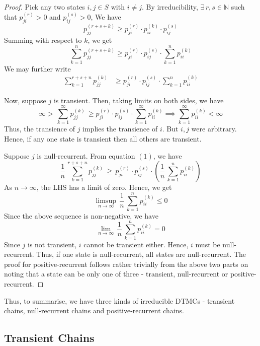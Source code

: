 \documentclass[12pt]{article}
\theoremstyle{definition}
\begin{document}
\setcounter{equation}{0}

\begin{proof}
    Pick any two states $i,j \in S$ with $i \neq j$. By irreducibility, $\exists \, r,s \in \mathbb{N}$ such that $p_{ji}^{(r)} > 0$ and $p_{ij}^{(s)} > 0$, We have
    \[
        p_{jj}^{(r+s+k)} \geq p_{ji}^{(r)} \cdot p_{ii}^{(k)} \cdot p_{ij}^{(s)}
    \]
    Summing with respect to $k$, we get
    \[
        \sum_{k=1}^{n} p_{jj}^{(r+s+k)} \geq p_{ji}^{(r)} \cdot p_{ij}^{(s)} \cdot \sum_{k=1}^n p_{ii}^{(k)}
    \]
    We may further write
    \begin{align}
        \sum_{k=1}^{r+s+n} p_{jj}^{(k)} &\geq p_{ji}^{(r)} \cdot p_{ij}^{(s)} \cdot \sum_{k=1}^n p_{ii}^{(k)}
    \end{align}
    
    Now, suppose $j$ is transient. Then, taking limits on both sides, we have
    \[
        \infty > \, \sum_{k=1}^{\infty} p_{jj}^{(k)} \, \geq p_{ji}^{(r)} \cdot p_{ij}^{(s)} \cdot \sum_{k=1}^{\infty} p_{ii}^{(k)} \implies \sum_{k=1}^{\infty} p_{ii}^{(k)} < \infty
    \]
    Thus, the transience of $j$ implies the transience of $i$. But $i,j$ were arbitrary. Hence, if any one state is transient then all others are transient. 
    
    \medskip
    
    Suppose $j$ is null-recurrent. From equation $(1)$, we have
    \[
        \frac{1}{n} \, \sum_{k=1}^{r+s+n} p_{jj}^{(k)} \, \geq \, p_{ji}^{(r)} \cdot p_{ij}^{(s)} \cdot \left( \frac{1}{n} \, \sum_{k=1}^n p_{ii}^{(k)} \right)
    \]
    As $n \to \infty$, the LHS has a limit of zero. Hence, we get
    \[
        \limsup_{n \to \infty} \, \frac{1}{n} \, \sum_{k=1}^n p_{ii}^{(k)} \leq 0
    \]
    Since the above sequence is non-negative, we have
    \[
        \lim_{n \to \infty} \, \frac{1}{n} \, \sum_{k=1}^n p_{ii}^{(k)} = 0
    \]
    Since $j$ is not transient, $i$ cannot be transient either. Hence, $i$ must be null-recurrent. Thus, if one state is null-recurrent, all states are null-recurrent. The proof for positive-recurrent follows rather trivially from the above two parts on noting that a state can be only one of three - transient, null-recurrent or positive-recurrent.
\end{proof}

Thus, to summarise, we have three kinds of irreducible DTMCs - transient chains, null-recurrent chains and positive-recurrent chains.

\newpage

\subsection{Transient Chains}
\end{document}
